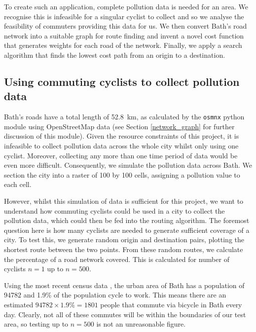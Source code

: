 \documentclass[11pt]{report}
\begin{document}

To create such an application, complete pollution data is needed for an area. We recognise this is infeasible for a singular cyclist to collect and so we analyse the feasibility of commuters providing this data for us. We then convert Bath's road network into a suitable graph for route finding and invent a novel cost function that generates weights for each road of the network. Finally, we apply a search algorithm that finds the lowest cost path from an origin to a destination. 

\subsection{Using commuting cyclists to collect pollution data}
% 

Bath's roads have a total length of 52.8~km, as calculated by the \texttt{osmnx} python module using OpenStreetMap data (see Section \ref{network_graph} for further discussion of this module). Given the resource constraints of this project, it is infeasible to collect pollution data across the whole city whilst only using one cyclist. Moreover, collecting any more than one time period of data would be even more difficult. Consequently, we simulate the pollution data across Bath. We section the city into a raster of 100 by 100 cells, assigning a pollution value to each cell.

However, whilst this simulation of data is sufficient for this project, we want to understand how commuting cyclists could be used in a city to collect the pollution data, which could then be fed into the routing algorithm. The foremost question here is how many cyclists are needed to generate sufficient coverage of a city. To test this, we generate random origin and destination pairs, plotting the shortest route between the two points. From these random routes, we calculate the percentage of a road network covered. This is calculated for number of cyclists $n=1$ up to $n=500$.

Using the most recent census data \citep{ons2011census}, the urban area of Bath has a population of $94782$ and 1.9\% of the population cycle to work. This means there are an estimated $94782 \times 1.9\% = 1801$ people that commute via bicycle in Bath every day. Clearly, not all of these commutes will be within the boundaries of our test area, so testing up to $n=500$ is not an unreasonable figure.
\end{document}

